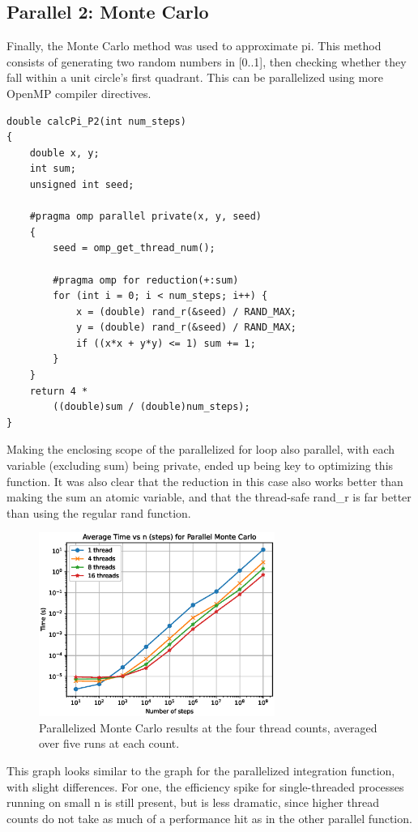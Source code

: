 \documentclass[a4paper]{article}
\begin{document}
\subsection{Parallel 2: Monte Carlo}
Finally, the Monte Carlo method was used to approximate pi. This method consists of generating two random numbers in [0..1], then checking whether they fall within a unit circle's first quadrant. This can be parallelized using more OpenMP compiler directives. 
\begin{verbatim}
double calcPi_P2(int num_steps)
{
	double x, y;
	int sum;
	unsigned int seed;

	#pragma omp parallel private(x, y, seed)
	{
		seed = omp_get_thread_num();
	
		#pragma omp for reduction(+:sum)
		for (int i = 0; i < num_steps; i++) {
			x = (double) rand_r(&seed) / RAND_MAX;
			y = (double) rand_r(&seed) / RAND_MAX;
			if ((x*x + y*y) <= 1) sum += 1;
		}
	} 
	return 4 * 
        ((double)sum / (double)num_steps);	
}
\end{verbatim}

Making the enclosing scope of the parallelized for loop also parallel, with each variable (excluding sum) being private, ended up being key to optimizing this function. It was also clear that the reduction in this case also works better than making the sum an atomic variable, and that the thread-safe rand\_r is far better than using the regular rand function. 

\begin{figure}[ht]
\begin{center}
\includegraphics[height=6cm]{carlo.eps}
\caption{Parallelized Monte Carlo results at the four thread counts, averaged over five runs at each count.}
\label{fig3}
\end{center}
\end{figure}

This graph looks similar to the graph for the parallelized integration function, with slight differences. For one, the efficiency spike for single-threaded processes running on small n is still present, but is less dramatic, since higher thread counts do not take as much of a performance hit as in the other parallel function. 
\end{document}
